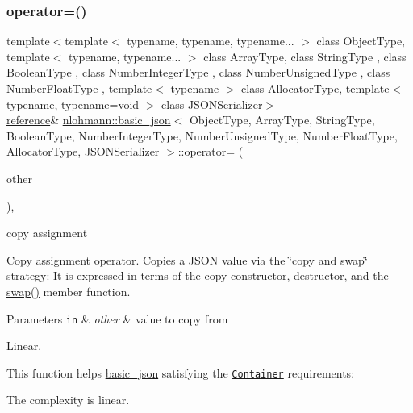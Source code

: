 \subsubsection{\texorpdfstring{operator=()}{operator=()}}
{\footnotesize\ttfamily template$<$template$<$ typename, typename, typename... $>$ class Object\+Type, template$<$ typename, typename... $>$ class Array\+Type, class String\+Type , class Boolean\+Type , class Number\+Integer\+Type , class Number\+Unsigned\+Type , class Number\+Float\+Type , template$<$ typename $>$ class Allocator\+Type, template$<$ typename, typename=void $>$ class J\+S\+O\+N\+Serializer$>$ \\
\hyperlink{classnlohmann_1_1basic__json_ac6a5eddd156c776ac75ff54cfe54a5bc}{reference}\& \hyperlink{classnlohmann_1_1basic__json}{nlohmann\+::basic\+\_\+json}$<$ Object\+Type, Array\+Type, String\+Type, Boolean\+Type, Number\+Integer\+Type, Number\+Unsigned\+Type, Number\+Float\+Type, Allocator\+Type, J\+S\+O\+N\+Serializer $>$\+::operator= (\begin{DoxyParamCaption}\item[{\hyperlink{classnlohmann_1_1basic__json}{basic\+\_\+json}$<$ Object\+Type, Array\+Type, String\+Type, Boolean\+Type, Number\+Integer\+Type, Number\+Unsigned\+Type, Number\+Float\+Type, Allocator\+Type, J\+S\+O\+N\+Serializer $>$}]{other }\end{DoxyParamCaption})\hspace{0.3cm}{\ttfamily [inline]}, {\ttfamily [noexcept]}}



copy assignment 

Copy assignment operator. Copies a J\+S\+ON value via the \char`\"{}copy and swap\char`\"{} strategy\+: It is expressed in terms of the copy constructor, destructor, and the {\ttfamily \hyperlink{classnlohmann_1_1basic__json_a8c9d932353e1ab98a7dc2fc27e002031}{swap()}} member function.


\begin{DoxyParams}[1]{Parameters}
\mbox{\tt in}  & {\em other} & value to copy from\\
\hline
\end{DoxyParams}
Linear.

This function helps {\ttfamily \hyperlink{classnlohmann_1_1basic__json}{basic\+\_\+json}} satisfying the \href{http://en.cppreference.com/w/cpp/concept/Container}{\tt Container} requirements\+:
\begin{DoxyItemize}
\item The complexity is linear.
\end{DoxyItemize}

